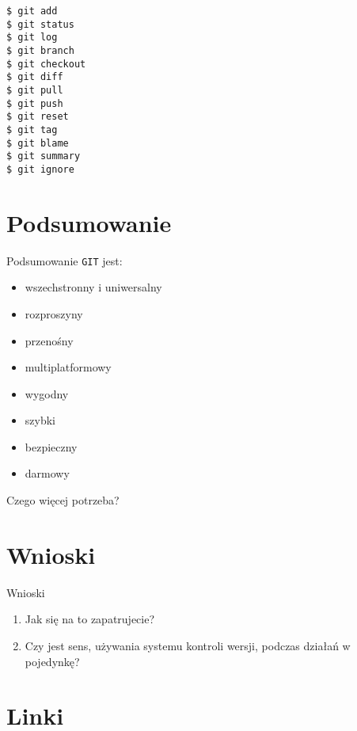 \documentclass{beamer}
\begin{document}
\begin{framed}
\begin{lstlisting}[frame=none, caption=Najpopularniejsze polecenia]
$ git add
$ git status
$ git log
$ git branch
$ git checkout
$ git diff
$ git pull
$ git push
$ git reset
$ git tag
$ git blame
$ git summary
$ git ignore
\end{lstlisting}
\end{framed}


\section{Podsumowanie}

\begin{frame}{Podsumowanie}
\texttt{GIT} jest:
\begin{itemize}
  \item wszechstronny i uniwersalny
  \item rozproszyny
  \item przenośny
  \item multiplatformowy
  \item wygodny
  \item szybki
  \item bezpieczny
  \item darmowy
\end{itemize}
\vskip 1cm
Czego więcej potrzeba?	
\end{frame}


\section{Wnioski}

\begin{frame}{Wnioski}
\begin{enumerate}
  \item Jak się na to zapatrujecie?
  \item Czy jest sens, używania systemu kontroli wersji, podczas działań w pojedynkę?
\end{enumerate}
\end{frame}


\section{Linki}
\end{document}
